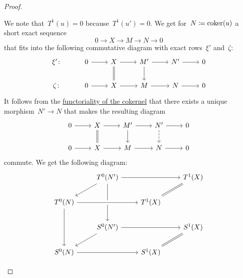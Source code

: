 \begin{proof}
\begin{enumerate}
      We note that~$T^1(u) = 0$ because~$T^1(u') = 0$.
      We get for~$N \coloneqq \operatorname{coker}(u)$ a short exact sequence
      \[
        0
        \to
        X
        \to
        M
        \to
        N
        \to
        0
      \]
      that fits into the following commutative diagram with exact rows~$\xi'$ and~$\zeta$:
      \[
        \begin{tikzcd}
            \xi'
            \colon
          & 0
            \arrow{r}
          & X
            \arrow{r}
            \arrow[equal]{d}
          & M'
            \arrow{r}
            \arrow{d}
          & N'
            \arrow{r}
          & 0
          \\
            \zeta
            \colon
          & 0
            \arrow{r}
          & X
            \arrow{r}
          & M
            \arrow{r}
          & N
            \arrow{r}
          & 0
        \end{tikzcd}
      \]
      It follows from the \hyperref[functoriality of (co)kernel]{functoriality of the cokernel} that there exists a unique morphism~$N' \to N$ that makes the resulting diagram
      \[
        \begin{tikzcd}
            0
            \arrow{r}
          & X
            \arrow{r}
            \arrow[equal]{d}
          & M'
            \arrow{r}
            \arrow{d}
          & N'
            \arrow{r}
            \arrow[dashed]{d}
          & 0
          \\
            0
            \arrow{r}
          & X
            \arrow{r}
          & M
            \arrow{r}
          & N
            \arrow{r}
          & 0
        \end{tikzcd}
      \]
      commute.
      We get the following diagram:
      \[
        \begin{tikzcd}
            {}
          & T^0(N')
            \arrow{rr}
            \arrow{dd}
            \arrow{dl}
          & {}
          & T^1(X)
            \arrow[equal]{dl}
          \\
            T^0(N)
            \arrow{rr}
            \arrow{dd}
          & {}
          & T^1(X)
            \arrow[from=ll, crossing over]
          & {}
          \\
            {}
          & S^0(N')
            \arrow{rr}
            \arrow{dl}
          & {}
          & S^1(X)
            \arrow[equal]{dl}
          \\
            S^0(N)
            \arrow{rr}
          & {}
          & S^1(X)
          & {}
        \end{tikzcd}
\]
\end{enumerate}
\end{proof}
